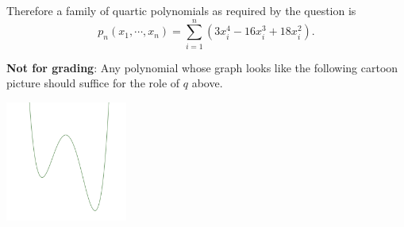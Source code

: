 \begin{enumerate}[label=(\alph*)]
Therefore a family of quartic polynomials as required by the question is $$p_{n}(x_{1},\cdots,x_{n}) = \sum_{i=1}^{n}\left(3x_{i}^{4}-16x_{i}^{3}+18x_{i}^{2}\right).$$


\begin{multicols}{2}
{\color{gray}\textbf{Not for grading}: Any polynomial whose graph looks like the following cartoon picture should suffice for the role of $q$ above.\vfill\null\columnbreak

\includegraphics[width=0.3\textwidth]{cartoon}


}

\end{multicols}

\end{enumerate}






